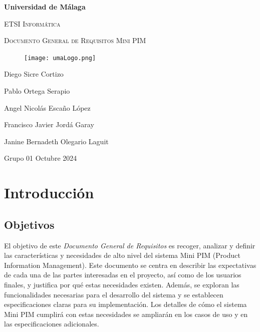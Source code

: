 \documentclass[12pt.a4paper]{article}
\begin{document}
\begin{titlepage}
\centering
{\bfseries\LARGE Universidad de Málaga\par}
\vspace{1cm}
{\scshape\Large ETSI Informática\par}
\vspace{2cm}
{\scshape\Huge Documento General de Requisitos Mini PIM}
\vspace{2cm}
\begin{figure}[H]
    \centering
     \texttt{[image: umaLogo.png]}
\end{figure}
\vfill
{\Large Diego Sicre Cortizo\par}
{\Large Pablo Ortega Serapio\par}
{\Large Angel Nicolás Escaño López\par}
{\Large Francisco Javier Jordá Garay\par}
{\Large Janine Bernadeth Olegario Laguit\par}
\vspace{1cm}
{\Large Grupo 01}
\vfill
{\Large Octubre 2024}

\end{titlepage}

\thispagestyle{empty} %
\tableofcontents
\thispagestyle{empty} %


\newpage
\setcounter{page}{1}
\section{Introducción}

\subsection{Objetivos}

El objetivo de este \textit{Documento General de Requisitos} es recoger, analizar y definir las características y necesidades de alto nivel del sistema Mini PIM (Product Information Management). Este documento se centra en describir las expectativas de cada una de las partes interesadas en el proyecto, así como de los usuarios finales, y justifica por qué estas necesidades existen. Además, se exploran las funcionalidades necesarias para el desarrollo del sistema y se establecen especificaciones claras para su implementación. Los detalles de cómo el sistema Mini PIM cumplirá con estas necesidades se ampliarán en los casos de uso y en las especificaciones adicionales.
\end{document}

